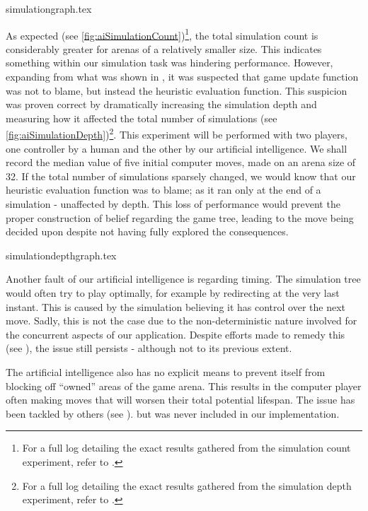 \documentclass{standalone}
\begin{document}
		{simulationgraph.tex}
		\FloatBarrier

	 	As expected (see \autoref{fig:aiSimulationCount})\footnote{For a full log detailing the exact results gathered from the simulation count experiment, refer to .}, the total simulation count is considerably greater for arenas of a relatively smaller size. This indicates something within our simulation task was hindering performance. However, expanding from what was shown in , it was suspected that game update function was not to blame, but instead the heuristic evaluation function. This suspicion was proven correct by dramatically increasing the simulation depth and measuring how it affected the total number of simulations (see \autoref{fig:aiSimulationDepth})\footnote{For a full log detailing the exact results gathered from the simulation depth experiment, refer to .}. This experiment will be performed with two players, one controller by a human and the other by our artificial intelligence. We shall record the median value of five initial computer moves, made on an arena size of 32. If the total number of simulations sparsely changed, we would know that our heuristic evaluation function was to blame; as it ran only at the end of a simulation - unaffected by depth. This loss of performance would prevent the proper construction of belief regarding the game tree, leading to the move being decided upon despite not having fully explored the consequences.

		{simulationdepthgraph.tex}
		\FloatBarrier

		Another fault of our artificial intelligence is regarding timing. The simulation tree would often try to play optimally, for example by redirecting at the very last instant. This is caused by the simulation believing it has control over the next move. Sadly, this is not the case due to the non-deterministic nature involved for the concurrent aspects of our application. Despite efforts made to remedy this (see ), the issue still persists - although not to its previous extent.

		The artificial intelligence also has no explicit means to prevent itself from blocking off \enquote{owned} areas of the game arena. This results in the computer player often making moves that will worsen their total potential lifespan. The issue has been tackled by others (see ). but was never included in our implementation.
\end{document}
